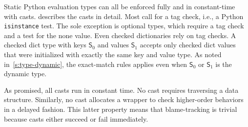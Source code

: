 \documentclass[english,cleveref,submission]{programming}
\newcommand{\SP}{Static Python}
\newcommand{\code}[1]{\texttt{#1}}
\newcommand{\typefont}[1]{\mathsf{#1}}
\newcommand{\spteval}{\typefont{S}}
\begin{document}
\SP{} evaluation types can all be enforced fully and in constant-time
with casts.
 describes the casts in detail.
Most call for a tag check, i.e., a Python \code{isinstance} test.
The sole exception is optional types, which require a tag check and a test for the none value.
Even checked dictionaries rely on tag checks.
A checked dict type with keys $\spteval_0$ and values $\spteval_1$ accepts only
checked dict values that were initialized with exactly the same key and value type.
As noted in~\cref{s:type-dynamic}, the exact-match rules applies even when $\spteval_0$
or $\spteval_1$ is the dynamic type.

As promised, all casts run in constant time.
No cast requires traversing a data structure.
Similarly, no cast allocates a wrapper to check higher-order behaviors in a delayed fashion.
This latter property means that blame-tracking is trivial because
casts either succeed or fail immediately.

\end{document}

